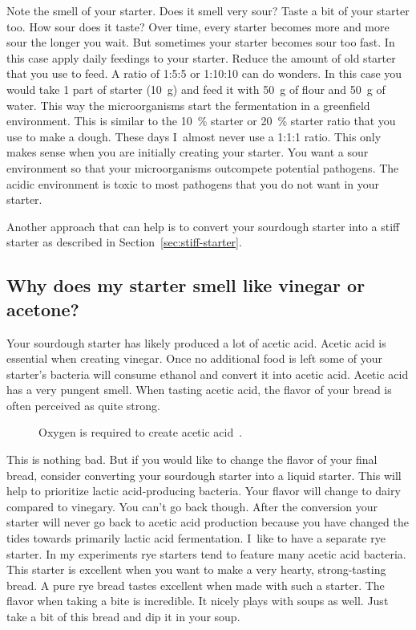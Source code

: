 Note the smell of your starter. Does it smell very sour?
Taste a bit of your starter too. How sour does it taste?
Over time, every starter becomes more and more sour the longer
you wait. But sometimes your starter becomes sour too fast.
In this case apply daily feedings to your starter. Reduce
the amount of old starter that you use to feed. A ratio
of 1:5:5 or 1:10:10 can do wonders. In this case you would
take 1 part of starter (\qty{10}{\gram}) and feed it with \qty{50}{\gram} of flour
and \qty{50}{\gram} of water. This way the microorganisms start
the fermentation in a greenfield environment. This is
similar to the \qty{10}{\percent} starter or  \qty{20}{\percent} starter
ratio that you use to make a dough. These days I~almost
never use a 1:1:1 ratio. This only makes sense when you
are initially creating your starter. You want a sour
environment so that your microorganisms outcompete
potential pathogens. The acidic environment is toxic
to most pathogens that you do not want in your starter.

Another approach that can help is to convert your
sourdough starter into a stiff starter as
described in Section~\ref{sec:stiff-starter}.

\subsection{Why does my starter smell like vinegar or acetone?}

Your sourdough starter has likely produced a lot of acetic acid.
Acetic acid is essential when creating vinegar. Once no additional
food is left some of your starter's bacteria will consume ethanol
and convert it into acetic acid. Acetic acid has a very pungent smell.
When tasting acetic acid, the flavor of your bread is often perceived
as quite strong.

\begin{figure}[!htb]
  \centering
  
  \caption[Acetic acid creation]{Oxygen is required to create acetic
      acid~\cite{acetic+acid+production}.}%
  \label{fig:ethanol-oxidation}
\end{figure}

This is nothing bad. But if you would like to change
the flavor of your final bread, consider converting
your sourdough starter into a liquid starter. This will
help to prioritize lactic acid-producing bacteria.
Your flavor will change to dairy compared to vinegary.
You can't go back though. After the conversion your starter
will never go back to acetic acid production because you have
changed the tides towards primarily lactic acid fermentation.
I~like to have a separate rye starter. In my experiments
rye starters tend to feature many acetic acid bacteria.
This starter is excellent when you want to make a very hearty,
strong-tasting bread. A pure rye bread tastes excellent when
made with such a starter. The flavor when taking a bite
is incredible. It nicely plays with soups as well. Just take
a bit of this bread and dip it in your soup.


